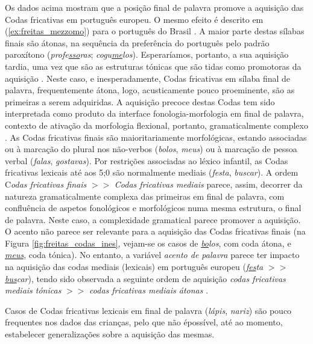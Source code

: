 \documentclass[output=paper]{LSP/langsci}
\begin{document}
Os dados acima mostram que a posição final de palavra promove a aquisição das Codas fricativas em português europeu. O mesmo efeito é descrito em (\ref{ex:freitas_mezzomo}) para o português do Brasil \citep{mezzomo2004}. A maior parte destas sílabas finais são átonas, na sequência da preferência do português pelo padrão paroxítono (\textit{profe\underline{sso}ras}; \textit{cogu\underline{me}los}). Esperaríamos, portanto, a sua aquisição tardia, uma vez que são as estruturas tónicas que são tidas como promotoras da aquisição \citep{fikkert1994}. Neste caso, e inesperadamente, Codas fricativas em sílaba final de palavra, frequentemente átona, logo, acusticamente pouco proeminente, são as primeiras a serem adquiridas. A aquisição precoce destas Codas tem sido interpretada como produto da interface fonologia-morfologia em final de palavra, contexto de ativação da morfologia flexional, portanto, gramaticalmente complexo \citep{freitas1997}. As Codas fricativas finais são maioritariamente morfológicas, estando associadas ou à marcação do plural nos não-verbos (\textit{bolos}, \textit{meus}) ou à marcação de pessoa verbal (\textit{falas}, \textit{gostavas}). Por restrições associadas ao léxico infantil, as Codas fricativas lexicais até aos 5;0 são normalmente mediais (\textit{festa}, \textit{buscar}). A ordem C\textit{odas fricativas finais} $>>$ \textit{Codas fricativas mediais} \citep{freitas1997} parece, assim, decorrer da natureza gramaticalmente complexa das primeiras em final de palavra, com confluência de aspetos fonológicos e morfológicos numa mesma estrutura, o final de palavra. Neste caso, a complexidade gramatical parece promover a aquisição. O acento não parece ser relevante para a aquisição das Codas fricativas finais (na Figura \ref{fig:freitas_codas_ines}, vejam-se os casos de \textit{\underline{bo}los}, com coda átona, e \textit{\underline{meus}}, coda tónica). No entanto, a variável \textit{acento de palavra} parece ter impacto na aquisição das codas mediais (lexicais) em português europeu (\textit{\underline{fes}ta} $>>$ \textit{\underline{bus}car}), tendo sido observada a seguinte ordem de aquisição \textit{codas fricativas mediais tónicas} $>>$ \textit{codas fricativas mediais átonas} \citep{freitas1997}.

Casos de Codas fricativas lexicais em final de palavra (\textit{lápis}, \textit{nariz}) são pouco frequentes nos dados das crianças, pelo que não é\largerpage possível, até ao momento, estabelecer generalizações sobre a aquisição das mesmas. 
\end{document}
